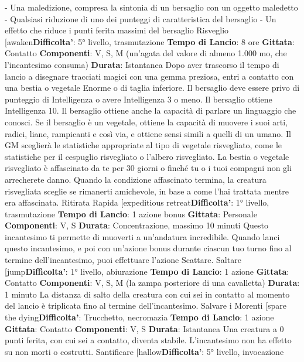 \begin{multicols}{2}
- Una maledizione, compresa la sintonia di un
bersaglio con un oggetto maledetto
- Qualsiasi riduzione di uno dei punteggi di
caratteristica del bersaglio
- Un effetto che riduce i punti ferita massimi del
bersaglio
Risveglio
[awaken\textbf{Difficolta'}:
5° livello, trasmutazione
\textbf{Tempo di Lancio}: 8 ore
\textbf{Gittata}: Contatto
\textbf{Componenti}: V, S, M (un’agata del valore di almeno
1.000 mo, che l’incantesimo consuma)
\textbf{Durata}: Istantanea
Dopo aver trascorso il tempo di lancio a disegnare
tracciati magici con una gemma preziosa, entri a
contatto con una bestia o vegetale Enorme o di taglia
inferiore. Il bersaglio deve essere privo di punteggio di
Intelligenza o avere Intelligenza 3 o meno. Il bersaglio
ottiene Intelligenza 10. Il bersaglio ottiene anche la
capacità di parlare un linguaggio che conosci. Se il
bersaglio è un vegetale, ottiene la capacità di muovere i
suoi arti, radici, liane, rampicanti e così via, e ottiene
sensi simili a quelli di un umano. Il GM sceglierà le
statistiche appropriate al tipo di vegetale risvegliato,
come le statistiche per il cespuglio risvegliato o l’albero
risvegliato.
La bestia o vegetale risvegliato è affascinato da te per
30 giorni o finché tu o i tuoi compagni non gli
arrecherete danno. Quando la condizione affascinato
termina, la creatura risvegliata sceglie se rimanerti
amichevole, in base a come l’hai trattata mentre era
affascinata.
Ritirata Rapida
[expeditious retreat\textbf{Difficolta'}:
1° livello, trasmutazione
\textbf{Tempo di Lancio}: 1 azione bonus
\textbf{Gittata}: Personale
\textbf{Componenti}: V, S
\textbf{Durata}: Concentrazione, massimo 10 minuti
Questo incantesimo ti permette di muoverti a
un’andatura incredibile. Quando lanci questo
incantesimo, e poi con un’azione bonus durante
ciascun tuo turno fino al termine dell’incantesimo, puoi
effettuare l’azione Scattare.
Saltare
[jump\textbf{Difficolta'}:
1° livello, abiurazione
\textbf{Tempo di Lancio}: 1 azione
\textbf{Gittata}: Contatto
\textbf{Componenti}: V, S, M (la zampa posteriore di una
cavalletta)
\textbf{Durata}: 1 minuto
La distanza di salto della creatura con cui sei in contatto
al momento del lancio è triplicata fino al termine
dell’incantesimo.
Salvare i Morenti
[spare the dying\textbf{Difficolta'}:
Trucchetto, necromazia
\textbf{Tempo di Lancio}: 1 azione
\textbf{Gittata}: Contatto
\textbf{Componenti}: V, S
\textbf{Durata}: Istantanea
Una creatura a 0 punti ferita, con cui sei a contatto,
diventa stabile. L’incantesimo non ha effetto su non
morti o costrutti.
Santificare
[hallow\textbf{Difficolta'}:
5° livello, invocazione

\end{multicols}
